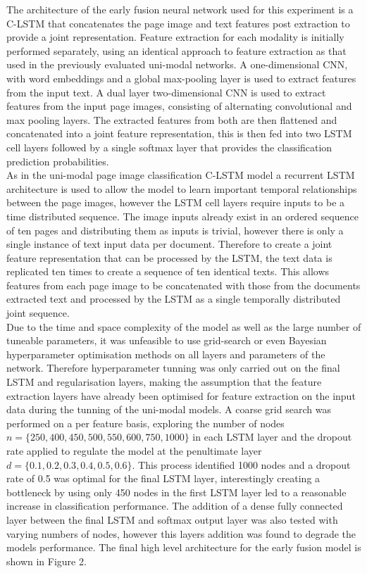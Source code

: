 \documentclass[a4paper,12pt]{article}
\begin{document}
The architecture of the early fusion neural network used for this experiment is a C-LSTM that concatenates the page image and text features post extraction to provide a joint representation. Feature extraction for each modality is initially performed separately, using an identical approach to feature extraction as that used in the previously evaluated uni-modal networks. A one-dimensional CNN, with word embeddings and a global max-pooling layer is used to extract features from the input text. A dual layer two-dimensional CNN is used to extract features from the input page images, consisting of alternating convolutional and max pooling layers. The extracted features from both are then flattened and concatenated into a joint feature representation, this is then fed into two LSTM cell layers followed by a single softmax layer that provides the classification prediction probabilities. \\

As in the uni-modal page image classification C-LSTM model a recurrent LSTM architecture is used to allow the model to learn important temporal relationships between the page images, however the LSTM cell layers require inputs to be a time distributed sequence. The image inputs already exist in an ordered sequence of ten pages and distributing them as inputs is trivial, however there is only a single instance of text input data per document. Therefore to create a joint feature representation that can be processed by the LSTM, the text data is replicated ten times to create a sequence of ten identical texts. This allows features from each page image to be concatenated with those from the documents extracted text and processed by the LSTM as a single temporally distributed joint sequence.\\

Due to the time and space complexity of the model as well as the large number of tuneable parameters, it was unfeasible to use grid-search or even Bayesian hyperparameter optimisation methods on all layers and parameters of the network. Therefore hyperparameter tunning was only carried out on the final LSTM and regularisation layers, making the assumption that the feature extraction layers have already been optimised for feature extraction on the input data during the tunning of the uni-modal models. A coarse grid search was performed on a per feature basis, exploring the number of nodes $n = \{250, 400, 450, 500, 550, 600, 750, 1000\} $ in each LSTM layer and the dropout rate applied to regulate the model at the penultimate layer $d = \{ 0.1, 0.2, 0.3, 0.4, 0.5, 0.6 \} $. This process identified 1000 nodes and a dropout rate of 0.5 was optimal for the final LSTM layer, interestingly creating a bottleneck by using only 450 nodes in the first LSTM layer led to a reasonable increase in classification performance. The addition of a dense fully connected layer between the final LSTM and softmax output layer was also tested with varying numbers of nodes, however this layers addition was found to degrade the models performance. The final high level architecture for the early fusion model is shown in Figure 2. \\
\end{document}
